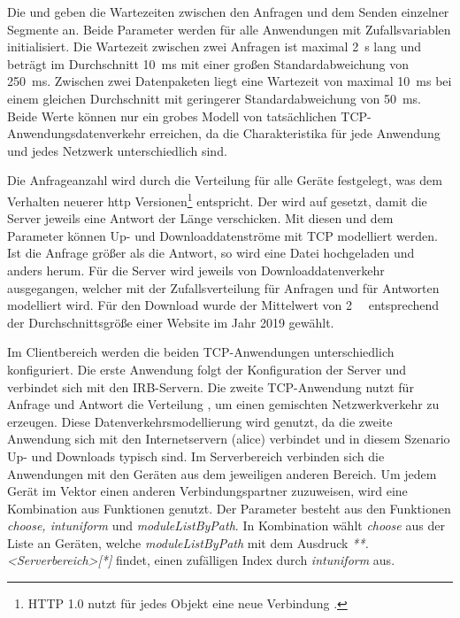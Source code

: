 Die  und  geben die Wartezeiten zwischen den Anfragen und dem Senden einzelner Segmente an. Beide Parameter werden für alle Anwendungen mit Zufallsvariablen initialisiert. Die Wartezeit zwischen zwei Anfragen ist maximal \SI{2}{\second} lang und beträgt im Durchschnitt \SI{10}{\milli\second} mit einer großen Standardabweichung von \SI{250}{\milli\second}. Zwischen zwei Datenpaketen liegt eine Wartezeit von maximal \SI{10}{\milli\second} bei einem gleichen Durchschnitt mit geringerer Standardabweichung von \SI{50}{\milli\second}. Beide Werte können nur ein grobes Modell von tatsächlichen TCP-Anwendungsdatenverkehr erreichen, da die Charakteristika für jede Anwendung und jedes Netzwerk unterschiedlich sind.

Die Anfrageanzahl wird durch die Verteilung  für alle Geräte festgelegt, was dem Verhalten neuerer \gls{http} Versionen\footnote{HTTP 1.0 nutzt für jedes Objekt eine neue Verbindung \cite{RFC1945}.} entspricht. Der  wird auf  gesetzt, damit die Server jeweils eine Antwort der Länge  verschicken. Mit diesen und dem Parameter  können Up- und Downloaddatenströme mit TCP modelliert werden. Ist die Anfrage größer als die Antwort, so wird eine Datei hochgeladen und anders herum. Für die Server wird jeweils von Downloaddatenverkehr ausgegangen, welcher mit der Zufallsverteilung  für Anfragen und  für Antworten modelliert wird. Für den Download wurde der Mittelwert von \SI{2}{\mega\byte} entsprechend der Durchschnittsgröße einer Website \cite{Almanac2019} im Jahr 2019 gewählt.

Im Clientbereich werden die beiden TCP-Anwendungen unterschiedlich konfiguriert. Die erste Anwendung folgt der Konfiguration der Server und verbindet sich mit den IRB-Servern. Die zweite TCP-Anwendung nutzt für Anfrage und Antwort die Verteilung , um einen gemischten Netzwerkverkehr zu erzeugen. Diese Datenverkehrsmodellierung wird genutzt, da die zweite Anwendung sich mit den Internetservern (alice) verbindet und in diesem Szenario Up- und Downloads typisch sind. Im Serverbereich verbinden sich die Anwendungen mit den Geräten aus dem jeweiligen anderen Bereich. Um jedem Gerät im Vektor einen anderen Verbindungspartner zuzuweisen, wird eine Kombination aus Funktionen genutzt. Der Parameter  besteht aus den Funktionen \emph{choose, intuniform} und \emph{moduleListByPath}. In Kombination wählt \emph{choose} aus der Liste an Geräten, welche \emph{moduleListByPath} mit dem Ausdruck \emph{**.<Serverbereich>[*]} findet, einen zufälligen Index durch \emph{intuniform} aus.

